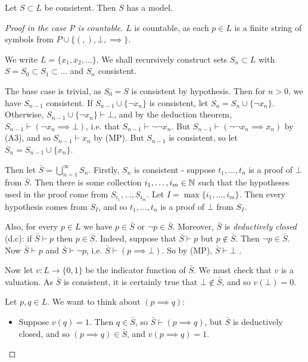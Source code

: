 \documentclass[10pt,a4paper]{article}
\begin{document}
\begin{theorem}
Let $S \subset L$ be consistent. Then $S$ has a model.
\end{theorem}
\begin{proof}[Proof in the case P is countable]
$L$ is countable, as each $p \in L$ is a finite string of symbols from $P \cup \{(,),\bot,\implies\}$.

We write $L = \{x_1, x_2, \ldots\}$. We shall recursively construct sets $S_n \subset L$ with $S=S_0 \subset S_1 \subset\ldots$ and $S_n$ consistent.

The base case is trivial, as $S_0 = S$ is consistent by hypothesis. Then for $n>0$, we have $S_{n-1}$ consistent. If $S_{n-1} \cup \{\neg x_n\}$ is consistent, let $S_n = S_n\cup \{\neg x_n\}$. Otherwise, $S_{n-1} \cup \{\neg x_n\} \vdash \bot$, and by the deduction theorem, $S_{n-1} \vdash (\neg x_n \implies \bot)$, i.e. that $S_{n-1} \vdash \neg \neg x_n$. But $S_{n-1} \vdash (\neg\neg x_n \implies x_n)$ by (A3), and so $S_{n-1} \vdash x_n$ by (MP). But $S_{n-1}$ is consistent, so let $S_n = S_{n-1} \cup \{x_n\}$.

Then let $\bar{S} = \bigcup_{n=1}^{\infty} S_n$. Firstly, $S_n$ is consistent - suppose $t_1, \ldots, t_n$ is a proof of $\bot$ from $\bar{S}$. Then there is some collection $i_1, \ldots, i_m \in \mathbb{N}$ such that the hypotheses used in the proof come from $S_{i_1}, \ldots, S_{i_m}$. Let $I = \max\{i_1, \ldots, i_m\}$. Then every hypothesis comes from $S_I$, and so $t_1, \ldots, t_n$ is a proof of $\bot$ from $S_I$. \contr

Also, for every $p \in L$ we have $p \in \bar{S}$ or $\neg p \in \bar{S}$. Moreover, $\bar{S}$ is \emph{deductively closed} (d.c): if $\bar{S} \vdash p$ then $p \in \bar{S}$. Indeed, suppose that $\bar{S} \vdash p$ but $p \notin \bar{S}$. Then $\neg p \in \bar{S}$. Now $\bar{S} \vdash p$ and $\bar{S} \vdash \neg p$, i.e. $\bar{S} \vdash (p \implies \bot)$. So by (MP), $\bar{S} \vdash \bot$ \contr. 

Now let $v: L \to \{0,1\}$ be the indicator function of $\bar{S}$. We must check that $v$ is a valuation. As $\bar{S}$ is consistent, it is certainly true that $\bot \notin \bar{S}$, and so $v(\bot) = 0$. 

Let $p, q \in L$. We want to think about $(p \implies q)$:
\begin{itemize}
\item[Case 1.] Suppose $v(q) = 1$. Then $q \in \bar{S}$, so $\bar{S} \vdash (p \implies q)$, but $\bar{S}$ is deductively closed, and so $(p \implies q) \in \bar{S}$, and $v(p \implies q) = 1$.


\end{itemize}
\end{proof}
\end{document}
